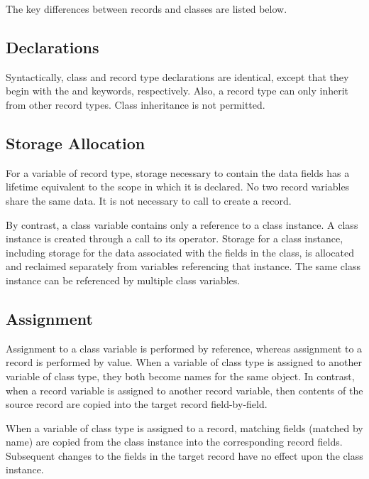 The key differences between records and classes are listed below.

\subsection{Declarations}
\label{Declaration_Differences}

Syntactically, class and record type declarations are identical, except that
they begin with the  and  keywords, respectively.
Also, a record type can only inherit from other record types.  Class inheritance
is not permitted.

\subsection{Storage Allocation}
\label{Storage_Allocation_Differences}

For a variable of record type, storage necessary to contain the data fields
has a lifetime equivalent to the scope in which it is declared.  No two record
variables share the same data.  It is not necessary to call  to create
a record.

By contrast, a class variable contains only a reference to a
class instance.  A class instance is created through a call to its 
operator.  Storage for a class instance, including storage for
the data associated with the fields in the class, is allocated and reclaimed
separately from variables referencing that instance.  The same class instance
can be referenced by multiple class variables.

\subsection{Assignment}
\label{Assignment_Differences}

Assignment to a class variable is performed by reference, whereas assignment to
a record is performed by value.  When a variable of class type is assigned to
another variable of class type, they both become names for the same object.  In
contrast, when a record variable is assigned to another record variable, then
contents of the source record are copied into the target record field-by-field.

When a variable of class type is assigned to a record, matching fields (matched
by name) are copied from the class instance into the corresponding record
fields.  Subsequent changes to the fields in the target record have no effect
upon the class instance.


